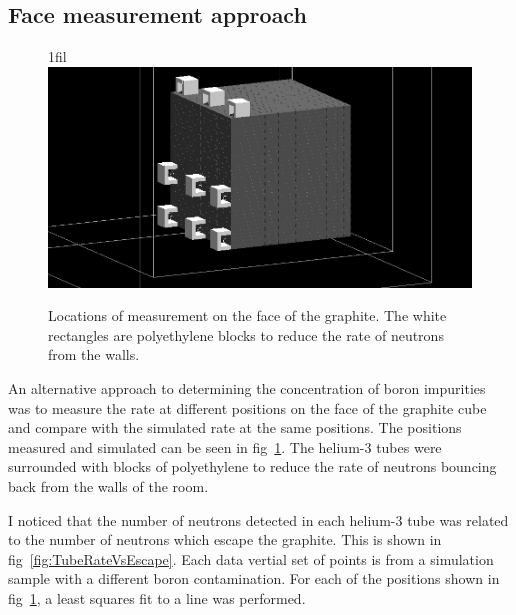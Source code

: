 \documentclass{article}
\makeatletter
\newcommand*{\centerfloat}{%
  \parindent \z@
  \leftskip \z@ \@plus 1fil \@minus \textwidth
  \rightskip\leftskip
  \parfillskip \z@skip}
\makeatother
\begin{document}
\newpage

\subsection{Face measurement approach}


\begin{figure}
	\centerfloat
	\includegraphics[width=\columnwidth]{images/FaceApproach}
	\caption{Locations of measurement on the face of the graphite. The white rectangles are polyethylene blocks to reduce the rate of neutrons from the walls.}	
	\label{fig:FaceImage}
\end{figure}

An alternative approach to determining the concentration of boron impurities was to measure the rate at different positions on the face of the graphite cube and compare with the simulated rate at the same positions. The positions measured and simulated can be seen in fig~\ref{fig:FaceImage}. The helium-3 tubes were surrounded with blocks of polyethylene to reduce the rate of neutrons bouncing back from the walls of the room.


I noticed that the number of neutrons detected in each helium-3 tube was related to the number of neutrons which escape the graphite. This is shown in fig~\ref{fig:TubeRateVsEscape}. Each data vertial set of points is from a simulation sample with a different boron contamination. For each of the positions shown in fig~\ref{fig:FaceImage}, a least squares fit to a line was performed.
\end{document}
